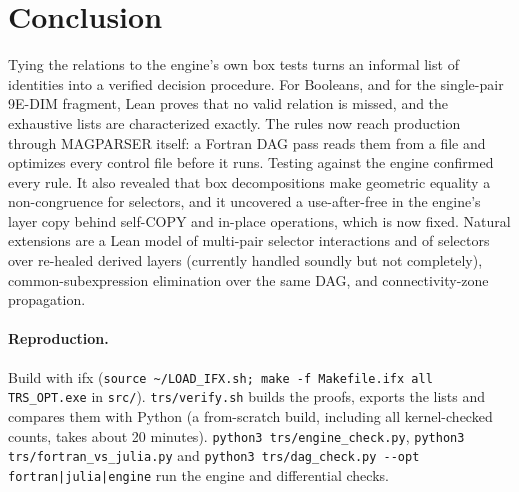 \documentclass[11pt]{article}
\begin{document}
\section{Conclusion}
Tying the relations to the engine's own box tests turns an informal list of identities into a verified decision procedure. For Booleans, and for the single-pair 9E-DIM fragment, Lean proves that no valid relation is missed, and the exhaustive lists are characterized exactly. The rules now reach production through MAGPARSER itself: a Fortran DAG pass reads them from a file and optimizes every control file before it runs. Testing against the engine confirmed every rule. It also revealed that box decompositions make geometric equality a non-congruence for selectors, and it uncovered a use-after-free in the engine's layer copy behind self-COPY and in-place operations, which is now fixed. Natural extensions are a Lean model of multi-pair selector interactions and of selectors over re-healed derived layers (currently handled soundly but not completely), common-subexpression elimination over the same DAG, and connectivity-zone propagation.

\paragraph{Reproduction.} Build with ifx (\texttt{source \~{}/LOAD\_IFX.sh; make -f Makefile.ifx all TRS\_OPT.exe} in \texttt{src/}). \texttt{trs/verify.sh} builds the proofs, exports the lists and compares them with Python (a from-scratch build, including all kernel-checked counts, takes about 20 minutes). \texttt{python3 trs/engine\_check.py}, \texttt{python3 trs/fortran\_vs\_julia.py} and \texttt{python3 trs/dag\_check.py -{}-opt fortran|julia|engine} run the engine and differential checks.
\end{document}
